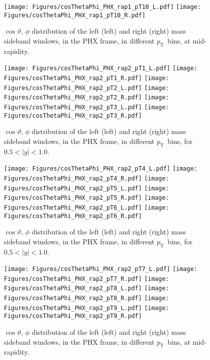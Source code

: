 \documentclass[12pt]{article}
\newcommand{\pt}{$p_{\mathrm{T}}$}
\begin{document}
\begin{figure}[htbp]
\centering
\texttt{[image: Figures/cosThetaPhi\_PHX\_rap1\_pT10\_L.pdf]}
\texttt{[image: Figures/cosThetaPhi\_PHX\_rap1\_pT10\_R.pdf]}
\caption{$\cos\vartheta,\,\phi$ distribution of the left (left) and
  right (right) mass sideband windows, in the PHX frame, in different
  \pt\ bins, at mid-rapidity.} 
\end{figure}
\clearpage

\begin{figure}[htbp]
\centering
\texttt{[image: Figures/cosThetaPhi\_PHX\_rap2\_pT1\_L.pdf]}
\texttt{[image: Figures/cosThetaPhi\_PHX\_rap2\_pT1\_R.pdf]}
\texttt{[image: Figures/cosThetaPhi\_PHX\_rap2\_pT2\_L.pdf]}
\texttt{[image: Figures/cosThetaPhi\_PHX\_rap2\_pT2\_R.pdf]}
\texttt{[image: Figures/cosThetaPhi\_PHX\_rap2\_pT3\_L.pdf]}
\texttt{[image: Figures/cosThetaPhi\_PHX\_rap2\_pT3\_R.pdf]}
\caption{$\cos\vartheta,\,\phi$ distribution of the left (left) and
  right (right) mass sideband windows, in the PHX frame, in different
  \pt\ bins, for $0.5 < |y| < 1.0$.}
\end{figure}
\clearpage

\begin{figure}[htbp]
\centering
\texttt{[image: Figures/cosThetaPhi\_PHX\_rap2\_pT4\_L.pdf]}
\texttt{[image: Figures/cosThetaPhi\_PHX\_rap2\_pT4\_R.pdf]}
\texttt{[image: Figures/cosThetaPhi\_PHX\_rap2\_pT5\_L.pdf]}
\texttt{[image: Figures/cosThetaPhi\_PHX\_rap2\_pT5\_R.pdf]}
\texttt{[image: Figures/cosThetaPhi\_PHX\_rap2\_pT6\_L.pdf]}
\texttt{[image: Figures/cosThetaPhi\_PHX\_rap2\_pT6\_R.pdf]}
\caption{$\cos\vartheta,\,\phi$ distribution of the left (left) and
  right (right) mass sideband windows, in the PHX frame, in different
  \pt\ bins, for $0.5 < |y| < 1.0$.} 
\end{figure}
\clearpage

\begin{figure}[htbp]
\centering
\texttt{[image: Figures/cosThetaPhi\_PHX\_rap2\_pT7\_L.pdf]}
\texttt{[image: Figures/cosThetaPhi\_PHX\_rap2\_pT7\_R.pdf]}
\texttt{[image: Figures/cosThetaPhi\_PHX\_rap2\_pT8\_L.pdf]}
\texttt{[image: Figures/cosThetaPhi\_PHX\_rap2\_pT8\_R.pdf]}
\texttt{[image: Figures/cosThetaPhi\_PHX\_rap2\_pT9\_L.pdf]}
\texttt{[image: Figures/cosThetaPhi\_PHX\_rap2\_pT9\_R.pdf]}
\caption{$\cos\vartheta,\,\phi$ distribution of the left (left) and
  right (right) mass sideband windows, in the PHX frame, in different
  \pt\ bins, at mid-rapidity.}
\end{figure}
\clearpage
\end{document}
